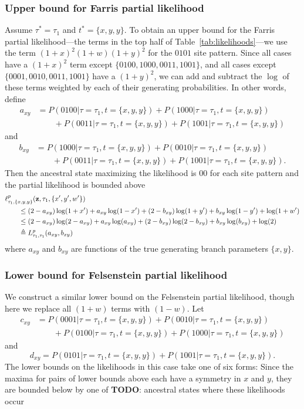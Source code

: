 \documentclass[a4paper]{article}
\begin{document}
\subsubsection{Upper bound for Farris partial likelihood}

Assume $\tau^*=\tau_1$ and $t^*=\{x,y,y\}$.
To obtain an upper bound for the Farris partial likelihood---the terms in the top half of Table~\ref{tab:likelihoods}---we use the term $(1+x)^2(1+w)(1+y)^2$ for the $0101$ site pattern.
Since all cases have a $(1+x)^2$ term except $\{0100, 1000, 0011, 1001\}$, and all cases except $\{0001, 0010, 0011, 1001\}$ have a $(1+y)^2$, we can add and subtract the $\log$ of these terms weighted by each of their generating probabilities.
In other words, define
\begin{align*}
    a_{xy} &= P(0100|\tau=\tau_1,t=\{x,y,y\}) + P(1000|\tau=\tau_1,t=\{x,y,y\}) \\
           &\qquad + P(0011|\tau=\tau_1,t=\{x,y,y\}) + P(1001|\tau=\tau_1,t=\{x,y,y\})
\end{align*}
and
\begin{align*}
    b_{xy} &= P(1000|\tau=\tau_1,t=\{x,y,y\}) + P(0010|\tau=\tau_1,t=\{x,y,y\}) \\
           &\qquad + P(0011|\tau=\tau_1,t=\{x,y,y\}) + P(1001|\tau=\tau_1,t=\{x,y,y\}).
\end{align*}
Then the ancestral state maximizing the likelihood is $00$ for each site pattern and the partial likelihood is bounded above
\begin{align*}
    & \ell^p_{\tau_1,\{x,y,y\}}(\mathbf{z},\tau_1,\{x',y',w'\}) \\
    &\qquad \le (2-a_{xy})\log(1+x')+a_{xy}\log(1-x')+(2-b_{xy})\log(1+y')+b_{xy}\log(1-y')+\log(1+w') \\
    &\qquad \le (2-a_{xy})\log(2-a_{xy})+a_{xy}\log(a_{xy})+(2-b_{xy})\log(2-b_{xy})+b_{xy}\log(b_{xy})+\log(2) \\
    &\qquad \triangleq L^p_{\tau_1,\tau_1}(a_{xy}, b_{xy})
\end{align*}
where $a_{xy}$ and $b_{xy}$ are functions of the true generating branch parameters $\{x,y\}$.

\subsubsection{Lower bound for Felsenstein partial likelihood}

We construct a similar lower bound on the Felsenstein partial likelihood, though here we replace all $(1+w)$ terms with $(1-w)$.
Let
\begin{align*}
    c_{xy} &= P(0001|\tau=\tau_1,t=\{x,y,y\}) + P(0010|\tau=\tau_1,t=\{x,y,y\}) \\
           &\qquad + P(0100|\tau=\tau_1,t=\{x,y,y\}) + P(1000|\tau=\tau_1,t=\{x,y,y\})
\end{align*}
and
$$
    d_{xy} = P(0101|\tau=\tau_1,t=\{x,y,y\}) + P(1001|\tau=\tau_1,t=\{x,y,y\}).
$$
The lower bounds on the likelihoods in this case take one of six forms:
Since the maxima for pairs of lower bounds above each have a symmetry in $x$ and $y$, they are bounded below by one of
\textbf{TODO}: ancestral states where these likelihoods occur
\end{document}
